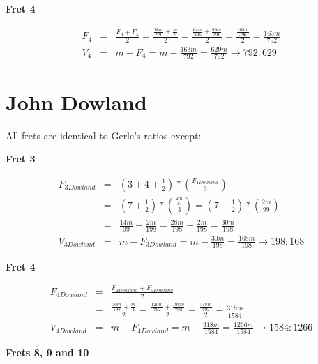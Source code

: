 \textbf{Fret 4}

\begin{eqnarray*}
    F_{4}
        &=& \frac{F_{3} + F_{5}}{2}
        = \frac{\frac{16m}{99} + \frac{m}{9}}{2}
        = \frac{\frac{64m}{396} + \frac{99m}{396}}{2}
        = \frac{\frac{163m}{396}}{2}
        = \frac{163m}{792} \\
    V_{4}
        &=& m - F_{4}
        = m - \frac{163m}{792}
        = \frac{629m}{792}
        \to 792:629
\end{eqnarray*}

\section{John Dowland}

All frets are identical to Gerle's ratios except:

\textbf{Fret 3}

\begin{eqnarray*}
    F_{3Dowland}
        &=& ( 3 + 4 + \frac{1}{2} ) * ( \frac{F_{1Dowland}}{3} ) \\
        &=& ( 7 + \frac{1}{2} ) * ( \frac{\frac{2m}{33}}{3} )
        = ( 7 + \frac{1}{2} ) * ( \frac{2m}{99} ) \\
        &=& \frac{14m}{99} + \frac{2m}{198}
        = \frac{28m}{198} + \frac{2m}{198}
        = \frac{30m}{198} \\
    V_{3Dowland}
        &=& m - F_{3Dowland}
        = m - \frac{30m}{198}
        = \frac{168m}{198}
        \to 198:168
\end{eqnarray*}

\textbf{Fret 4}

\begin{eqnarray*}
    F_{4Dowland}
        &=& \frac{F_{2Dowland} + F_{5Dowland}}{2} \\
        &=& \frac{\frac{30m}{198} + \frac{m}{4}}{2}
        = \frac{\frac{120m}{792} + \frac{198m}{792}}{2}
        = \frac{\frac{318m}{792}}{2}
        = \frac{318m}{1584} \\
    V_{4Dowland}
        &=& m - F_{4Dowland}
        = m - \frac{318m}{1584}
        = \frac{1266m}{1584}
        \to 1584:1266
\end{eqnarray*}

\textbf{Frets 8, 9 and 10}

